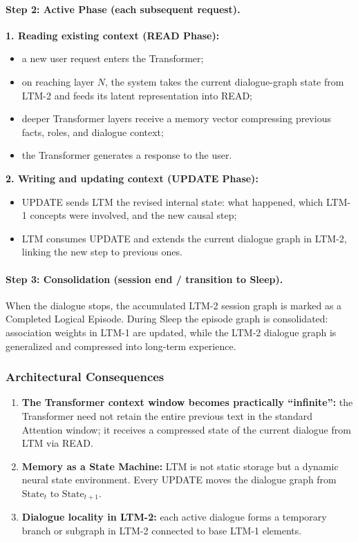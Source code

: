 \documentclass[11pt,a4paper]{article}
\begin{document}
\paragraph{Step 2: Active Phase (each subsequent request).}
\textbf{1. Reading existing context (READ Phase):}
\begin{itemize}
\item a new user request enters the Transformer;
\item on reaching layer $N$, the system takes the current dialogue-graph state from LTM-2 and feeds its latent representation into READ;
\item deeper Transformer layers receive a memory vector compressing previous facts, roles, and dialogue context;
\item the Transformer generates a response to the user.
\end{itemize}
\textbf{2. Writing and updating context (UPDATE Phase):}
\begin{itemize}
\item UPDATE sends LTM the revised internal state: what happened, which LTM-1 concepts were involved, and the new causal step;
\item LTM consumes UPDATE and extends the current dialogue graph in LTM-2, linking the new step to previous ones.
\end{itemize}

\paragraph{Step 3: Consolidation (session end / transition to Sleep).}
When the dialogue stops, the accumulated LTM-2 session graph is marked as a Completed Logical Episode. During Sleep the episode graph is consolidated: association weights in LTM-1 are updated, while the LTM-2 dialogue graph is generalized and compressed into long-term experience.

\subsubsection*{Architectural Consequences}
\begin{enumerate}
\item \textbf{The Transformer context window becomes practically ``infinite'':} the Transformer need not retain the entire previous text in the standard Attention window; it receives a compressed state of the current dialogue from LTM via READ.
\item \textbf{Memory as a State Machine:} LTM is not static storage but a dynamic neural state environment. Every UPDATE moves the dialogue graph from $\mathrm{State}_t$ to $\mathrm{State}_{t+1}$.
\item \textbf{Dialogue locality in LTM-2:} each active dialogue forms a temporary branch or subgraph in LTM-2 connected to base LTM-1 elements.
\end{enumerate}
\end{document}
